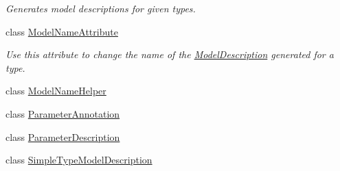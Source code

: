 \begin{DoxyCompactItemize}
\begin{DoxyCompactList}\small\item\em Generates model descriptions for given types. \end{DoxyCompactList}\item 
class \hyperlink{classApi3Layers_1_1Areas_1_1HelpPage_1_1ModelDescriptions_1_1ModelNameAttribute}{Model\+Name\+Attribute}
\begin{DoxyCompactList}\small\item\em Use this attribute to change the name of the \hyperlink{classApi3Layers_1_1Areas_1_1HelpPage_1_1ModelDescriptions_1_1ModelDescription}{Model\+Description} generated for a type. \end{DoxyCompactList}\item 
class \hyperlink{classApi3Layers_1_1Areas_1_1HelpPage_1_1ModelDescriptions_1_1ModelNameHelper}{Model\+Name\+Helper}
\item 
class \hyperlink{classApi3Layers_1_1Areas_1_1HelpPage_1_1ModelDescriptions_1_1ParameterAnnotation}{Parameter\+Annotation}
\item 
class \hyperlink{classApi3Layers_1_1Areas_1_1HelpPage_1_1ModelDescriptions_1_1ParameterDescription}{Parameter\+Description}
\item 
class \hyperlink{classApi3Layers_1_1Areas_1_1HelpPage_1_1ModelDescriptions_1_1SimpleTypeModelDescription}{Simple\+Type\+Model\+Description}
\end{DoxyCompactItemize}
